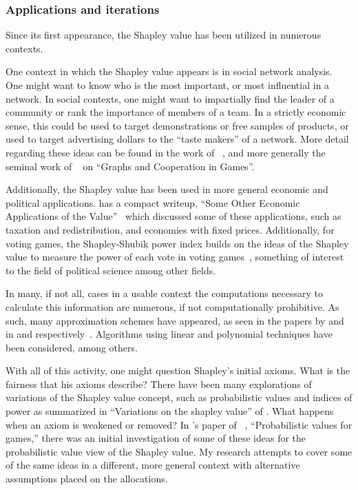 \documentclass[12pt,letterpaper,final]{article}
\theoremstyle{plain}
\theoremstyle{plain}
\theoremstyle{plain}
\theoremstyle{plain}
\theoremstyle{plain}
\theoremstyle{plain}
\theoremstyle{plain}
\theoremstyle{definition}
\theoremstyle{definition}
\theoremstyle{definition}
\theoremstyle{definition}
\theoremstyle{definition}
\theoremstyle{remark}
\theoremstyle{remark}
\theoremstyle{remark}
\theoremstyle{remark}
\begin{document}
\subsubsection{Applications and iterations}
Since its first appearance, the Shapley value has been utilized in
numerous contexts.

One context in which the Shapley value appears is in social network
analysis. One might want to know who is the most important, or most
influential in a network.
In social contexts, one might want to impartially find the leader of a
community or rank the importance of members of a team.
In a strictly economic sense, this could be used to target demonstrations
or free samples of products, or used to target
advertising dollars to the ``taste makers'' of a network. More detail
regarding these ideas can be found in the work of
\citeauthor{GGMOPT03,NaNa11, PaGi11}~\cite{GGMOPT03,NaNa11, PaGi11},
and more generally the seminal work of
\citeauthor{Myerson77}~\cite{Myerson77} on ``Graphs and Cooperation in Games''.

Additionally, the Shapley value has been used in more general economic and political
applications. \citeauthor{Mertens02} has a compact
writeup, ``Some Other Economic Applications of the Value''~\cite{Mertens02} which discussed some
of these applications, such as taxation and redistribution, and
economies with fixed prices. Additionally, for voting games, the
Shapley-Shubik power index builds on the ideas of the Shapley value to
measure the power of each vote in voting games~\cite{ShaShu54},
something of interest to the field of political science among other fields. 

In many, if not all, cases in a usable context the computations
necessary to calculate this information are
numerous, if not computationally prohibitive. As such, many
approximation schemes have appeared, as seen in the
papers by \citeauthor{Owen72,Fatima08} and \citeauthor{Castro09} in
\citeyear{Owen72,Fatima08} and \citeyear{Castro09}
respectively~\cite{Owen72,Fatima08,Castro09}. Algorithms
using linear and polynomial techniques have been considered, among others.

With all of this activity, one might question Shapley's initial
axioms. What is the fairness that his axioms describe? There have been
many explorations of variations of the Shapley 
value concept, such as probabilistic values and indices of power  as
summarized in ``Variations on the shapley value'' of \citeauthor{MonSam02}
\cite{MonSam02}. What happens when an axiom is weakened or removed? In
\citeauthor{Weber78}'s paper of \citeyear{Weber78}~\cite{Weber78},
``Probabilistic values for games,'' there was an initial investigation of some of
these ideas for the probabilistic value view of the Shapley value. My
research attempts to cover some of the same ideas in a different, more
general context with alternative assumptions placed on 
the allocations. 
\end{document}
